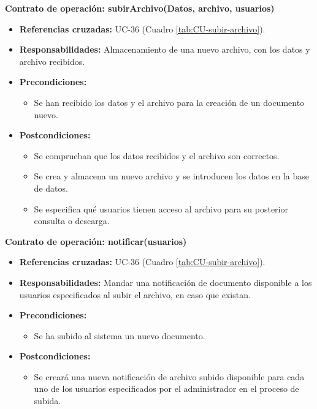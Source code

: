 \textbf{Contrato de operación: subirArchivo(Datos, archivo, usuarios)}
\begin{itemize}
\item \textbf{Referencias cruzadas:} UC-36 (Cuadro \ref{tab:CU-subir-archivo}).
\item \textbf{Responsabilidades:} Almacenamiento de una nuevo archivo, con los datos y archivo recibidos.
\item \textbf{Precondiciones:} 
 \begin{itemize}
\item Se han recibido los datos y el archivo para la creación de un documento nuevo.
\end {itemize}
\item \textbf{Postcondiciones:} 
 \begin{itemize}
 \item Se comprueban que los datos recibidos y el archivo son correctos.
\item Se crea y almacena un nuevo archivo y se introducen los datos en la base de datos.
\item Se especifica qué usuarios tienen acceso al archivo para su posterior consulta o descarga.
\end {itemize}
\end {itemize}

\textbf{Contrato de operación: notificar(usuarios)}
\begin{itemize}
\item \textbf{Referencias cruzadas:} UC-36 (Cuadro \ref{tab:CU-subir-archivo}).
\item \textbf{Responsabilidades:} Mandar una notificación de documento disponible a los usuarios especificados al subir el archivo, en caso que existan.
\item \textbf{Precondiciones:} 
 \begin{itemize}
\item Se ha subido al sistema un nuevo documento.
\end {itemize}
\item \textbf{Postcondiciones:} 
 \begin{itemize}
\item Se creará una nueva notificación de archivo subido disponible para cada uno de los usuarios especificados por el administrador en el proceso de subida.
\end {itemize}
\end {itemize}

